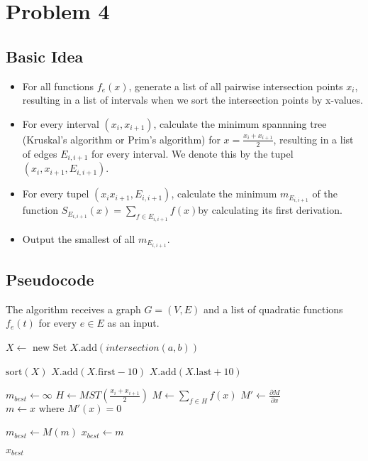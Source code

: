 \documentclass[12pt]{article}
\begin{document}
\section*{Problem 4}
\subsection*{Basic Idea}
\begin{itemize}
	\item For all functions $f_e(x)$, generate a list of all pairwise intersection points $x_i$, resulting in a list of intervals when we sort the intersection points by x-values.
	\item For every interval $(x_i, x_{i+1})$, calculate the minimum spannning tree (Kruskal's algorithm or Prim's algorithm) for $x= \frac{x_i + x_{i+1}}{2}$, resulting in a list of edges $E_{i,i+1}$ for every interval. We denote this by the tupel $(x_i, x_{i+1}, E_{i, i+1})$.
	\item For every tupel $(x_i x_{i+1}, E_{i, i+1})$, calculate the minimum $m_{E_{i, i+1}}$ of the function $S_{E_{i, i+1}}(x) = \sum_{f \in E_{i, i+1}} f(x)$by calculating its first derivation.
	\item Output the smallest of all $m_{E_{i, i+1}}$.
\end{itemize} 

\subsection*{Pseudocode}
The algorithm receives a graph $G=(V,E)$ and a list of quadratic functions $f_e(t)$ for every $e \in E$ as an input.

\begin{algorithmic}
	\State $X \gets \mbox{ new Set}$
			\State $X.\mbox{add}(\mathit{intersection}(a, b))$
		\EndFor
	\EndFor
	
	\State $\mbox{sort}(X)$
	\State $X.\mbox{add}(X.\mbox{first} - 10)$
	\State $X.\mbox{add}(X.\mbox{last} + 10)$

	\State $m_{\mathit{best}} \gets \infty$	
		\State $H \gets \mathit{MST}(\frac{x_i + x_{i+1}}{2})$
		\State $M \gets \sum_{f \in H} f(x)$
		\State $M' \gets \frac{\partial M}{\partial x}$
		\State $m \gets x \mbox{ where } M'(x) = 0$
		
			\State $m_{best} \gets M(m)$
			\State $x_{best} \gets m$
		\EndIf
	\EndFor

	\Return $x_{best}$
\end{algorithmic}
\end{document}
